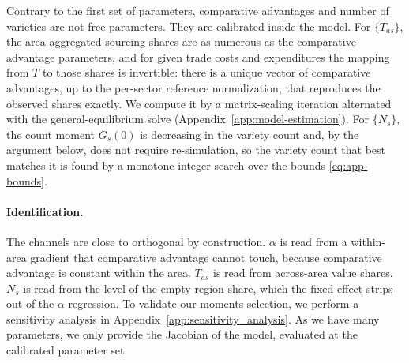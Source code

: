 Contrary to the first set of parameters, comparative advantages and number of varieties are not free parameters. They are calibrated inside the model. For $\{T_{as}\}$, the area-aggregated sourcing shares are as numerous as the comparative-advantage parameters, and for given trade costs and expenditures the mapping from $T$ to those shares is invertible: there is a unique vector of comparative advantages, up to the per-sector reference normalization, that reproduces the observed shares exactly. We compute it by a matrix-scaling iteration alternated with the general-equilibrium solve (Appendix~\ref{app:model-estimation}). For $\{N_{s}\}$, the count moment $\bar G_{s}(0)$ is decreasing in the variety count and, by the argument below, does not require re-simulation, so the variety count that best matches it is found by a monotone integer search over the bounds \eqref{eq:app-bounds}. 


\paragraph{Identification.} The channels are close to orthogonal by construction. $\alpha$ is read from a within-area gradient that comparative advantage cannot touch, because comparative advantage is constant within the area. $T_{as}$ is read from across-area value shares. $N_{s}$ is read from the level of the empty-region share, which the fixed effect strips out of the $\alpha$ regression. To validate our moments selection, we perform a sensitivity analysis in Appendix~\ref{app:sensitivity_analysis}. As we have many parameters, we only provide the Jacobian of the model, evaluated at the calibrated parameter set.  


